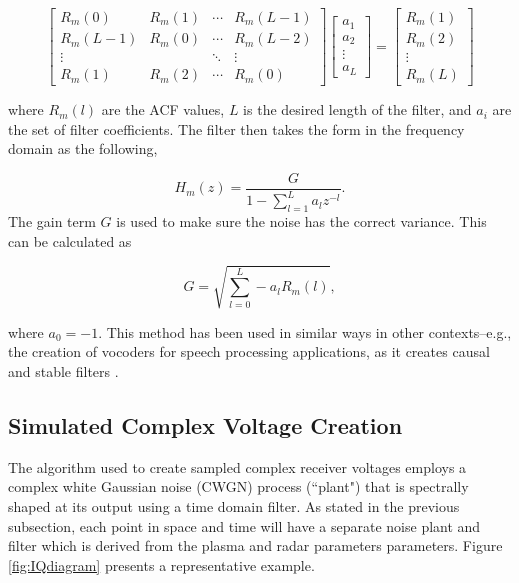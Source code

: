 \documentclass[draft,ras]{agutex}
\begin{document}
\begin{article}
\begin{equation}
\label{eq:filtereq}
\begin{bmatrix} R_m(0) & R_m(1)& \cdots & R_m(L-1) \\ R_m(L-1) & R_m(0)& \cdots & R_m(L-2)\\ \vdots & &\ddots  & \vdots \\  R_m(1) & R_m(2) & \cdots & R_m(0) \end{bmatrix} \left[ \begin{array}{c} a_1\\ a_2\\\vdots \\ a_L \end{array} \right]=\left[ \begin{array}{c} R_m(1) \\ R_m(2)\\ \vdots \\R_m(L) \end{array} \right]
\end{equation}

\noindent where $R_m(l)$ are the ACF values, $L$ is the desired length of the filter, and $ a_i$ are the set of filter coefficients. The filter then takes the form in the frequency domain as the following,

\begin{equation}
\label{eq:filtz}
H_m(z) = \frac{G}{1-\displaystyle \sum_{l=1}^{L} a_l z^{-l}}.
\end{equation}
\noindent The gain term $G$ is used to make sure the noise has the correct variance. This can be calculated as 

\begin{equation}
\label{eq:gainterm}
G=\sqrt{\displaystyle \sum_{l=0}^L -a_l R_m(l)},
\end{equation}

\noindent where $a_0=-1$. This method has been used in similar ways in other contexts--e.g., the creation of vocoders for speech processing applications, as it creates causal and stable filters \citep{rabinerdigitalspeech}.

\subsection{Simulated Complex Voltage Creation}

The algorithm used to create sampled complex receiver voltages employs a complex white Gaussian noise (CWGN) process (``plant") that is spectrally shaped at its output using a time domain filter. As stated in the previous subsection, each point in space and time will have a separate noise plant and filter which is derived from the plasma and radar parameters parameters. Figure \ref{fig:IQdiagram} presents a representative example. 


\end{article}
\end{document}
